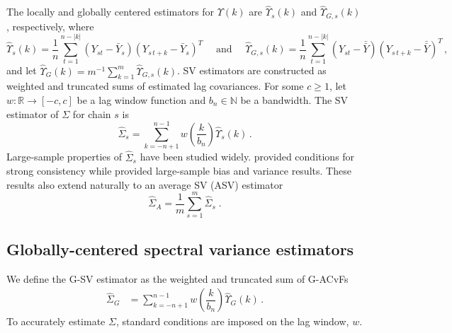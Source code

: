 \documentclass[11pt]{article}
\newcommand{\ds}{\displaystyle}
\theoremstyle{remark}
\begin{document}
The locally and globally centered  estimators for $\Upsilon(k)$ are $\hat{\Upsilon}_s(k)$ and $\hat{\Upsilon}_{G,s}(k)$, respectively, where
\[
\hat{\Upsilon}_s(k) = \dfrac{1}{n} \ds \sum_{t=1}^{n - |k|} (Y_{st} - \bar{Y}_s)(Y_{s\,t+k} - \bar{Y}_s)^T \quad \text{ and } \quad \hat{\Upsilon}_{G,s}(k) = \dfrac{1}{n} \ds \sum_{t=1}^{n - |k|} (Y_{st} - \bar{\bar{Y}})(Y_{s\,t+k} - \bar{\bar{Y}})^T\,,
\] 
and let $\hat{\Upsilon}_G(k) = m^{-1} \sum_{k=1}^{m}\hat{\Upsilon}_{G,s}(k)$. SV estimators are constructed as weighted and truncated sums of estimated lag covariances. For some $c \geq 1$, let $w: \mathbb{R} \to [-c,c]$ be a lag window function and $b_n \in \mathbb{N}$ be a bandwidth. The SV estimator of $\Sigma$ for chain $s$ is
%
%
\begin{equation} \label{eq:sve}
    \hat{\Sigma}_{s} = \sum_{k=-n+1}^{n-1}w\left(\dfrac{k}{b_n}\right)\hat{\Upsilon}_s(k)\,.
\end{equation}
Large-sample properties of $\hat{\Sigma}_s$ have been studied widely. \cite{vats:fleg:jon:2018} provided conditions for strong consistency while \cite{fleg:jone:2010,vats:flegal:2018} provided large-sample bias and variance results. These results also extend naturally to an average SV (ASV) estimator
\[
\hat{\Sigma}_A = \dfrac{1}{m}\sum_{s=1}^{m}\hat{\Sigma}_{s}\;.
\]


\subsection{Globally-centered spectral variance estimators} %
\label{sub:globally_centered_spectral_variance_estimators}


We define the G-SV estimator as the weighted and truncated sum of G-ACvFs
%
\begin{align*}
    \hat{\Sigma}_{G} &= \sum_{k=-n+1}^{n-1}w\left(\dfrac{k}{b_n}\right)\hat{\Upsilon}_{G}(k)\,.
\end{align*}
%
To accurately estimate $\Sigma$, standard conditions are imposed on the lag window, $w$. 
%
\end{document}
